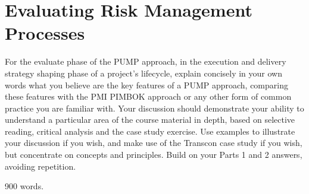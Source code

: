 \section{Evaluating Risk Management Processes} \label{s:Evaluate}

For the evaluate phase of the PUMP approach, in the execution and delivery strategy shaping phase of a project’s lifecycle, explain concisely in your own words what you believe are the key features of a PUMP approach, comparing these features with the PMI PIMBOK approach or any other form of common practice you are familiar with. Your discussion should demonstrate your ability to understand a particular area of the course material in depth, based on selective reading, critical analysis and the case study exercise. Use examples to illustrate your discussion if you wish, and make use of the Transcon case study if you wish, but concentrate on concepts and principles. Build on your Parts 1 and 2 answers, avoiding repetition.

900 words.